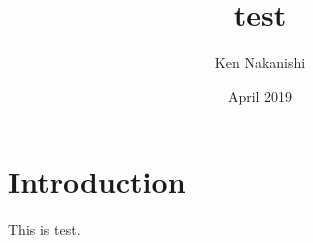 \documentclass{article}
\title{test}
\author{Ken Nakanishi}
\date{April 2019}
\begin{document}
\maketitle

\section{Introduction}
This is test.
\end{document}
